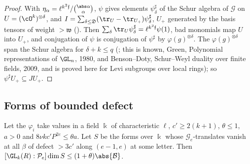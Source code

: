 \begin{proof}
With $\eta_\alpha=\ell^{k^2\mathfrak f}/\binom{\abs\alpha}\alpha$, $\psi$ gives elements
$\psi^\sharp_\delta$ of the Schur algebra of $\mathcal G$ on $U=(\cO^k)^{\otimes\delta}$, and
$I=\sum_{\delta\le \mathfrak D}(\tr_U-\tr_{U_+})\psi^\sharp_\delta$, $U_+$ generated by the basis tensors of
weight $>\mathfrak w$ (). Then $\sum_\delta\tr_U\psi^\sharp_\delta=
\ell^{k^2\mathfrak f}\psi(1)$, bad monomials map $U$ into $U_+$, and conjugation of $\psi$ is
conjugation of $\psi^\sharp$ by $\varphi(g)^{\otimes\delta}$. The $\varphi(g)^{\otimes\delta}$ span the
Schur algebra for $\delta+k\le q$ (; this
is known, Green, Polynomial representations of $\GL_n$, 1980, and Benson--Doty, Schur--Weyl duality
over finite fields, 2009, and is proved here for Levi subgroups over local rings); so
$\psi^\sharp U_+\subseteq JU_+$.
\end{proof}

\subsection{Forms of bounded defect}\label{ub-eldiv:sec:count}

\begin{proposition}
\label{ub-eldiv:prop:count}
Let the $\varphi_i$ take values in a field $\Bbbk$ of characteristic $\ell$, $c'\ge2(k+1)$, $\theta\le1$,
$a>0$ and $8\nu kc'P^{2e}\le\theta a$. Let $S$ be the forms over $\Bbbk$ whose $\mathcal G_e$-translates
vanish at all $\beta$ of defect $>3c'$ along $(e-1,e)$ at some letter. Then
$[\GL_k(R):\mathcal P_e]\dim S\le(1+\theta)\abs{\mathcal B}$.
\end{proposition}

